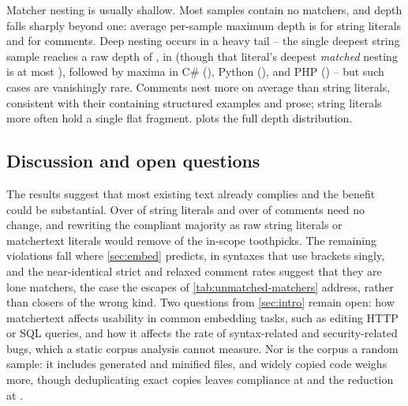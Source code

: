 Matcher nesting is usually shallow.
Most samples contain no matchers,
and depth falls sharply beyond one:
average per-sample maximum depth
is \dataStrAvgDepth for string literals
and \dataDocAvgDepth for comments.
Deep nesting occurs in a heavy tail --
the single deepest string sample reaches a raw depth of \dataStrMaxDepth,
in \dataStrMaxDepthHost (though that literal's deepest \emph{matched} nesting is at most \dataStrMaxDepthValidBound),
followed by maxima in C\# (\dataHostCSharpMaxDepth), Python (\dataHostPythonMaxDepth),
and PHP (\dataHostPHPMaxDepth) --
but such cases are vanishingly rare.
Comments nest more on average than string literals,
consistent with their containing structured examples and prose;
string literals more often hold a single flat fragment.
 plots the full depth distribution.


\subsection{Discussion and open questions}
\label{sec:eval:open}

The results suggest that most existing text already complies
and the benefit could be substantial.
Over \dataStrComplianceFloor of string literals and over \dataDocComplianceFloor of comments need no change,
and rewriting the compliant majority
as raw string literals or matchertext literals
would remove \dataReduction of the in-scope toothpicks.
The remaining violations fall where \cref{sec:embed} predicts,
in syntaxes that use brackets singly,
and the near-identical strict and relaxed comment rates suggest that
they are lone matchers, the case the escapes of \cref{tab:unmatched-matchers} address,
rather than closers of the wrong kind.
Two questions from \cref{sec:intro} remain open:
how matchertext affects usability in common embedding tasks,
such as editing HTTP or SQL queries,
and how it affects the rate of syntax-related and security-related bugs,
which a static corpus analysis cannot measure.
Nor is the corpus a random sample:
it includes generated and minified files,
and widely copied code weighs more,
though deduplicating exact copies leaves compliance at \dataDedupStrCompliance{}
and the reduction at \dataDedupReduction{}.
